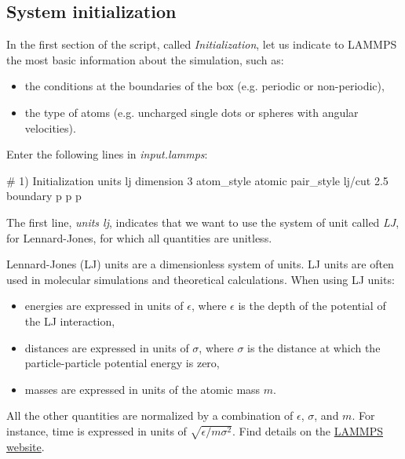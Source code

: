 \subsection{System initialization}
\noindent In the first section of the script, called \textit{Initialization},
let us indicate to LAMMPS the most basic information
about the simulation, such as:

\begin{itemize}
\item the conditions at the boundaries of the box (e.g. periodic or non-periodic),
\item the type of atoms (e.g. uncharged single dots or spheres with angular velocities).
\end{itemize}

\vspace{0.25cm} \noindent Enter the following lines in \textit{input.lammps}:

\begin{lcverbatim}
# 1) Initialization
units lj
dimension 3
atom_style atomic
pair_style lj/cut 2.5
boundary p p p
\end{lcverbatim}

\noindent The first line, \textit{units lj}, indicates that we want to
use the system of unit called \textit{LJ}, for Lennard-Jones, for
which all quantities are unitless. 

\begin{tcolorbox}[colback=mylightblue!5!white,colframe=mylightblue!75!black,title=About Lennard-Jones (LJ) units]

\vspace{0.25cm} \noindent Lennard-Jones (LJ) units are a dimensionless system of units.
LJ units are often used in molecular simulations
and theoretical calculations. When using LJ units:

\begin{itemize}
\item energies are expressed in units of $\epsilon$, where $\epsilon$ is the
  depth of the potential of the LJ interaction,
\item distances are expressed in units of $\sigma$, where $\sigma$ is the distance
  at which the particle-particle potential energy is zero,
\item masses are expressed in units of the atomic mass $m$.
\end{itemize}

\vspace{0.25cm} \noindent All the other quantities are normalized by a combination of $\epsilon$, $\sigma$,
and $m$. For instance, time is expressed in units of $\sqrt{ \epsilon / m \sigma^2}$.
Find details on the \href{https://docs.lammps.org/units.html}{LAMMPS website}.
\end{tcolorbox}

